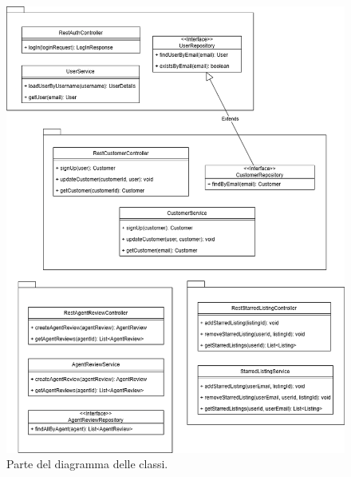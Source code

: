 \begin{figure}[H]
    \centering
    \includegraphics[width=\textwidth]{assets/diagrams/class-diagram/class-diagram-2.png}
    \caption{Parte del diagramma delle classi.}
    \label{fig:Parte 2 del diagramma delle classi}
\end{figure}

